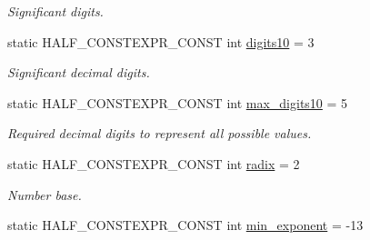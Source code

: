 \begin{DoxyCompactItemize}
\begin{DoxyCompactList}\small\item\em Significant digits. \end{DoxyCompactList}\item 
static H\+A\+L\+F\+\_\+\+C\+O\+N\+S\+T\+E\+X\+P\+R\+\_\+\+C\+O\+N\+ST int \hyperlink{classstd_1_1numeric__limits_3_01half__float_1_1half_01_4_adb8ec10ec96a1c60db49b40554fb13ef}{digits10} = 3\hypertarget{classstd_1_1numeric__limits_3_01half__float_1_1half_01_4_adb8ec10ec96a1c60db49b40554fb13ef}{}\label{classstd_1_1numeric__limits_3_01half__float_1_1half_01_4_adb8ec10ec96a1c60db49b40554fb13ef}

\begin{DoxyCompactList}\small\item\em Significant decimal digits. \end{DoxyCompactList}\item 
static H\+A\+L\+F\+\_\+\+C\+O\+N\+S\+T\+E\+X\+P\+R\+\_\+\+C\+O\+N\+ST int \hyperlink{classstd_1_1numeric__limits_3_01half__float_1_1half_01_4_a07d190feb781f88a0d6190afd1d5279a}{max\+\_\+digits10} = 5\hypertarget{classstd_1_1numeric__limits_3_01half__float_1_1half_01_4_a07d190feb781f88a0d6190afd1d5279a}{}\label{classstd_1_1numeric__limits_3_01half__float_1_1half_01_4_a07d190feb781f88a0d6190afd1d5279a}

\begin{DoxyCompactList}\small\item\em Required decimal digits to represent all possible values. \end{DoxyCompactList}\item 
static H\+A\+L\+F\+\_\+\+C\+O\+N\+S\+T\+E\+X\+P\+R\+\_\+\+C\+O\+N\+ST int \hyperlink{classstd_1_1numeric__limits_3_01half__float_1_1half_01_4_af8a3c3c34ae601c519a4e5be73b81998}{radix} = 2\hypertarget{classstd_1_1numeric__limits_3_01half__float_1_1half_01_4_af8a3c3c34ae601c519a4e5be73b81998}{}\label{classstd_1_1numeric__limits_3_01half__float_1_1half_01_4_af8a3c3c34ae601c519a4e5be73b81998}

\begin{DoxyCompactList}\small\item\em Number base. \end{DoxyCompactList}\item 
static H\+A\+L\+F\+\_\+\+C\+O\+N\+S\+T\+E\+X\+P\+R\+\_\+\+C\+O\+N\+ST int \hyperlink{classstd_1_1numeric__limits_3_01half__float_1_1half_01_4_ae545fa9d20d845ae1bf55bb6ce6b7e1d}{min\+\_\+exponent} = -\/13\hypertarget{classstd_1_1numeric__limits_3_01half__float_1_1half_01_4_ae545fa9d20d845ae1bf55bb6ce6b7e1d}{}\label{classstd_1_1numeric__limits_3_01half__float_1_1half_01_4_ae545fa9d20d845ae1bf55bb6ce6b7e1d}


\end{DoxyCompactItemize}
